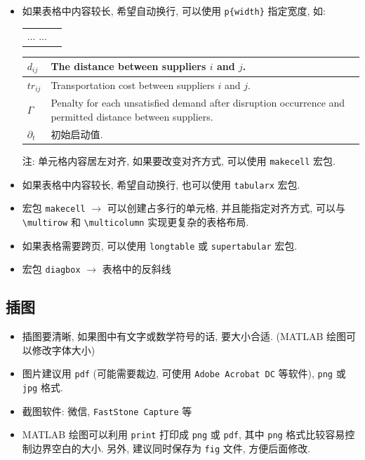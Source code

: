 \documentclass[openany]{MathematicalModelCaseStudyReport}  %
\numberwithin{algorithm}{chapter}
\begin{document}
\begin{itemize}
\item 如果表格中内容较长, 希望自动换行, 可以使用 \Verb|p{width}| 指定宽度, 如:
\begin{syntax}
  \begin{tabular}{p{1em}|p{30em}} 
    ... ... 
  \end{tabular}
\end{syntax}  
  
  \begin{tabular}{p{1em}|p{30em}} \toprule
    $d_{ij}$ & The distance between suppliers $i$ and $j$. \\\midrule
    $tr_{ij}$ & Transportation cost between suppliers $i$ and $j$.\\\midrule
    $\Gamma$ & Penalty for each unsatisfied demand after disruption occurrence
      and  permitted distance between suppliers.\\ \midrule
    $\partial_{t}$ & 初始启动值.\\ \bottomrule
  \end{tabular}\smallskip

  注: 单元格内容居左对齐, 如果要改变对齐方式, 可以使用 \Verb|makecell| 宏包.

  \medskip

  \item 如果表格中内容较长, 希望自动换行, 也可以使用 \Verb|tabularx| 宏包.

  \item 宏包 \Verb|makecell| $\to$ 可以创建占多行的单元格, 并且能指定对齐方式,
    可以与 \Verb|\multirow| 和 \Verb|\multicolumn| 实现更复杂的表格布局.

  \item 如果表格需要跨页, 可以使用 \Verb|longtable| 或  \Verb|supertabular| 宏包.

  \item 宏包 \Verb|diagbox| $\to$ 表格中的反斜线

\end{itemize}


\clearpage
\subsection{插图}
\begin{itemize}
  \item 插图要清晰, 如果图中有文字或数学符号的话, 要大小合适. (MATLAB 绘图可以修改字体大小)
  \item 图片建议用 \Verb|pdf| (可能需要裁边, 可使用 \Verb|Adobe Acrobat DC| 等软件), \Verb|png| 或 \Verb|jpg| 格式.
  \item 截图软件: 微信, \Verb|FastStone Capture| 等
  \item MATLAB 绘图可以利用 \Verb|print| 打印成 \Verb|png| 或 \Verb|pdf|,
    其中 \Verb|png| 格式比较容易控制边界空白的大小.
    另外, 建议同时保存为 \Verb|fig| 文件, 方便后面修改.
\end{itemize}
\end{document}

